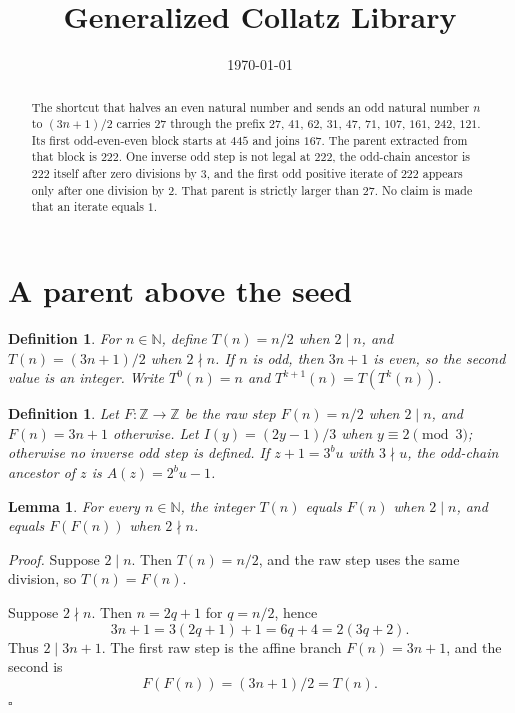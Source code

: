 \documentclass[11pt,letterpaper]{article}
\title{Generalized Collatz Library}
\author{}
\date{\today}
\newcommand{\N}{\mathbb{N}}
\newcommand{\Z}{\mathbb{Z}}
\newtheorem{lemma}[theorem]{Lemma}
\newtheorem{definition}[theorem]{Definition}
\newenvironment{proof}{\noindent\textit{Proof.}}{\hfill\(\square\)}
\begin{document}
\maketitle
\section*{A parent above the seed}

\begin{abstract}
The shortcut that halves an even natural number and sends an odd natural number \(n\) to \((3n+1)/2\) carries \(27\) through the prefix \(27\), \(41\), \(62\), \(31\), \(47\), \(71\), \(107\), \(161\), \(242\), \(121\). Its first odd-even-even block starts at \(445\) and joins \(167\). The parent extracted from that block is \(222\). One inverse odd step is not legal at \(222\), the odd-chain ancestor is \(222\) itself after zero divisions by \(3\), and the first odd positive iterate of \(222\) appears only after one division by \(2\). That parent is strictly larger than \(27\). No claim is made that an iterate equals \(1\).
\end{abstract}

\begin{definition}
\label{def:shortcut}
For \(n\in\N\), define \(T(n)=n/2\) when \(2\mid n\), and \(T(n)=(3n+1)/2\) when \(2\nmid n\). If \(n\) is odd, then \(3n+1\) is even, so the second value is an integer. Write \(T^{0}(n)=n\) and \(T^{k+1}(n)=T(T^{k}(n))\).
\end{definition}

\begin{definition}
\label{def:raw}
Let \(F:\Z\to\Z\) be the raw step \(F(n)=n/2\) when \(2\mid n\), and \(F(n)=3n+1\) otherwise. Let \(I(y)=(2y-1)/3\) when \(y\equiv 2\pmod{3}\); otherwise no inverse odd step is defined. If \(z+1=3^{b}u\) with \(3\nmid u\), the odd-chain ancestor of \(z\) is \(A(z)=2^{b}u-1\).
\end{definition}

\begin{lemma}
\label{lem:clock}
For every \(n\in\N\), the integer \(T(n)\) equals \(F(n)\) when \(2\mid n\), and equals \(F(F(n))\) when \(2\nmid n\).
\end{lemma}

\begin{proof}
Suppose \(2\mid n\). Then \(T(n)=n/2\), and the raw step uses the same division, so \(T(n)=F(n)\).

Suppose \(2\nmid n\). Then \(n=2q+1\) for \(q=n/2\), hence
\[
3n+1=3(2q+1)+1=6q+4=2(3q+2).
\]
Thus \(2\mid 3n+1\). The first raw step is the affine branch \(F(n)=3n+1\), and the second is
\[
F(F(n))=(3n+1)/2=T(n).
\]
\end{proof}
\end{document}
